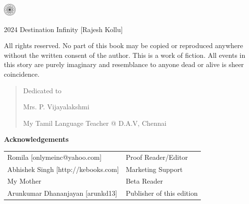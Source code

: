\begin{center}
\HUGE{\thetitle}
\end{center}
\cleardoublepage

\begin{center}
\HUGE{\thetitle}
\end{center}

\begin{center}
\LARGE{\theauthor}
\end{center}

\vfill

\begin{center}
    \includegraphics[width=18pt]{logo.pdf}
\end{center}
\clearpage

\begingroup
\footnotesize
\setlength{\parindent}{0pt}
\setlength{\parskip}{\baselineskip}

\textcopyright{} 2024 Destination Infinity [Rajesh Kollu]

All rights reserved. No part of this book may be copied or reproduced anywhere
without the written consent of the author. This is a work of fiction. All events
in this story are purely imaginary and resemblance to anyone dead or alive is sheer
coincidence.

\endgroup
\clearpage

\begin{quote}
\begin{center}Dedicated to

\LARGE
Mrs. P. Vijayalakshmi
\normalsize

My Tamil Language Teacher @ D.A.V, Chennai
\end{center}
\end{quote}

\vfill

\textbf{Acknowledgements}

\footnotesize
\begin{tabular}{l l}
Romila [onlymeinc@yahoo.com] & Proof Reader/Editor \\
Abhishek Singh [http://kebooks.com] & Marketing Support \\
My Mother & Beta Reader \\
Arunkumar Dhananjayan [arunkd13] & Publisher of this edition
\end{tabular}


\clearpage
